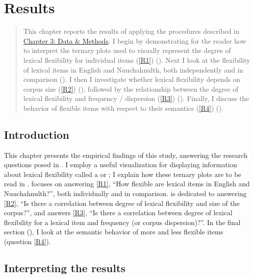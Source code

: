 \chapter{Results}
\label{ch:results}

\blockquote{This chapter reports the results of applying the procedures described in \hyperref[ch:methods]{Chapter 3: Data \& Methods}. I begin by demonstrating for the reader how to interpret the ternary plots used to visually represent the degree of lexical flexibility for individual items (\ref{R1}) (). Next I look at the flexibility of lexical items in English and Nuuchahnulth, both independently and in comparison (). I then I investigate whether lexical flexibility depends on corpus size (\ref{R2}) (), followed by the relationship between the degree of lexical flexibility and frequency / dispersion (\ref{R3}) (). Finally, I discuss the behavior of flexible items with respect to their semantics (\ref{R4}) ().}

\section{Introduction}
\label{sec:4.1}

This chapter presents the empirical findings of this study, answering the research questions posed in . I employ a useful visualization for displaying information about lexical flexibility called a  or ; I explain how these ternary plots are to be read in .  focuses on answering \ref{R1}, \enquote{How flexible are lexical items in English and Nuuchahnulth?}, both individually and in comparison.  is dedicated to answering \ref{R2}, \enquote{Is there a correlation between degree of lexical flexibility and size of the corpus?}, and  answers \ref{R3}, \enquote{Is there a correlation between degree of lexical flexibility for a lexical item and frequency (or corpus dispersion)?}. In the final section (), I look at the semantic behavior of more and less flexible items (question \ref{R4}).

\section{Interpreting the results}
\label{sec:4.2}

